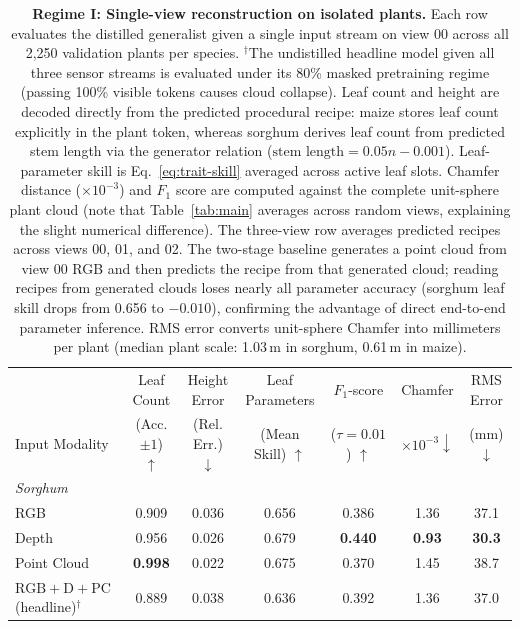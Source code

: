 \documentclass[10pt,twocolumn,letterpaper]{article}
\begin{document}
\begin{table}[t]
  \caption{\textbf{Regime I: Single-view reconstruction on isolated plants.} Each row evaluates the distilled generalist given a single input stream on view 00 across all 2{,}250 validation plants per species. $^{\dagger}$The undistilled headline model given all three sensor streams is evaluated under its 80\% masked pretraining regime (passing 100\% visible tokens causes cloud collapse). Leaf count and height are decoded directly from the predicted procedural recipe: maize stores leaf count explicitly in the plant token, whereas sorghum derives leaf count from predicted stem length via the generator relation ($\text{stem length} = 0.05n - 0.001$). Leaf-parameter skill is Eq.~\eqref{eq:trait-skill} averaged across active leaf slots. Chamfer distance ($\times 10^{-3}$) and $F_1$ score are computed against the complete unit-sphere plant cloud (note that Table~\ref{tab:main} averages across random views, explaining the slight numerical difference). The three-view row averages predicted recipes across views 00, 01, and 02. The two-stage baseline generates a point cloud from view 00 RGB and then predicts the recipe from that generated cloud; reading recipes from generated clouds loses nearly all parameter accuracy (sorghum leaf skill drops from 0.656 to $-0.010$), confirming the advantage of direct end-to-end parameter inference. RMS error converts unit-sphere Chamfer into millimeters per plant (median plant scale: 1.03\,m in sorghum, 0.61\,m in maize).}
  \label{tab:regime1}
  \centering\scriptsize
  \setlength{\tabcolsep}{4.5pt}
  \begin{tabular}{l cc c ccc}
    \toprule
    & Leaf Count & Height Error & Leaf Parameters & $F_1$-score & Chamfer & RMS Error \\
    Input Modality & (Acc. $\pm 1$) $\uparrow$ & (Rel. Err.) $\downarrow$ & (Mean Skill) $\uparrow$ & ($\tau=0.01$) $\uparrow$ & $\times10^{-3}\downarrow$ & (mm) $\downarrow$ \\
    \midrule
    \multicolumn{7}{l}{\emph{Sorghum}} \\
    RGB & 0.909 & 0.036 & 0.656 & 0.386 & 1.36 & 37.1 \\
    Depth & 0.956 & 0.026 & 0.679 & \textbf{0.440} & \textbf{0.93} & \textbf{30.3} \\
    Point Cloud & \textbf{0.998} & 0.022 & 0.675 & 0.370 & 1.45 & 38.7 \\
    $\mathrm{RGB}+\mathrm{D}+\mathrm{PC}$ (headline)$^\dagger$ & 0.889 & 0.038 & 0.636 & 0.392 & 1.36 & 37.0 \\

\end{tabular}
\end{table}
\end{document}
